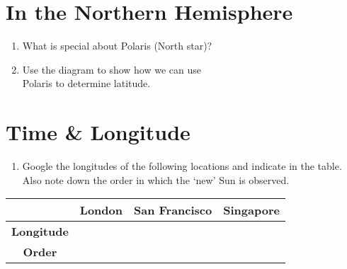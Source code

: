 \section{In the Northern Hemisphere}
\begin{minipage}{0.45\linewidth}
	\begin{enumerate}[\style (1)]\resume
		\item What is special about Polaris (North star)?\brk
		\item Use the diagram to show how we can use\\ Polaris to determine latitude.
	\end{enumerate}\save

	\bigskip
	\section{Time \& Longitude}
	\begin{enumerate}[\style (1)]\resume
		\item Google the longitudes of the following locations and indicate in the table. Also note down the order in which the `new' Sun is observed.
	\end{enumerate}\save
	{
		\renewcommand{\arraystretch}{1.5}
		\begin{tabular}{>{\bfseries}c|*3{C{.275\linewidth}|}}
			& London & San Francisco & Singapore \\
			\toprule
			Longitude & & & \\ \midrule
			Order & & & \\
			\bottomrule
		\end{tabular}
	}
\end{minipage}
\begin{minipage}{0.4\linewidth}
	\globe
\end{minipage}

\bigskip

